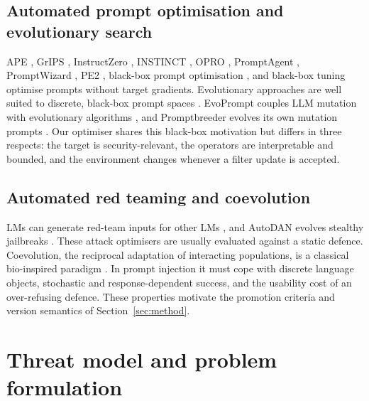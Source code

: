 \documentclass[preprint,12pt,authoryear]{elsarticle}
\begin{document}
\subsection{Automated prompt optimisation and evolutionary search}
APE \citep{zhou2023ape}, GrIPS \citep{prasad2023grips}, InstructZero \citep{chen2023instructzero}, INSTINCT \citep{lin2023instinct}, OPRO \citep{yang2024opro}, PromptAgent \citep{wang2023promptagent}, PromptWizard \citep{agarwal2024promptwizard}, PE2 \citep{ye2024pe2}, black-box prompt optimisation \citep{cheng2024bpo}, and black-box tuning \citep{sun2024colorful} optimise prompts without target gradients. Evolutionary approaches are well suited to discrete, black-box prompt spaces \citep{back1996evolutionary,eiben2015introduction}. EvoPrompt couples LLM mutation with evolutionary algorithms \citep{guo2024evoprompt}, and Promptbreeder evolves its own mutation prompts \citep{fernando2023promptbreeder}. Our optimiser shares this black-box motivation but differs in three respects: the target is security-relevant, the operators are interpretable and bounded, and the environment changes whenever a filter update is accepted.

\subsection{Automated red teaming and coevolution}
LMs can generate red-team inputs for other LMs \citep{perez2022redteaming}, and AutoDAN evolves stealthy jailbreaks \citep{liu2023autodan}. These attack optimisers are usually evaluated against a static defence. Coevolution, the reciprocal adaptation of interacting populations, is a classical bio-inspired paradigm \citep{floreano2008bioinspired}. In prompt injection it must cope with discrete language objects, stochastic and response-dependent success, and the usability cost of an over-refusing defence. These properties motivate the promotion criteria and version semantics of Section~\ref{sec:method}.

\section{Threat model and problem formulation}
\label{sec:problem}
\end{document}

